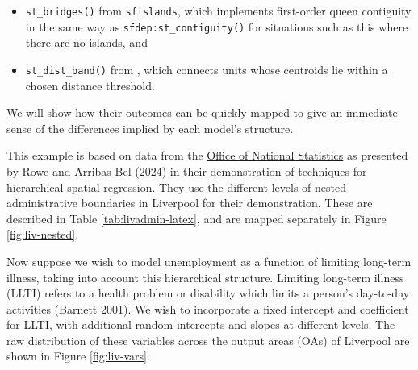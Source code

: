 \begin{itemize}
\tightlist
\item
  \texttt{st\_bridges()} from \texttt{sfislands}, which implements first-order queen contiguity in the same way as \texttt{sfdep:st\_contiguity()} for situations such as this where there are no islands, and
\item
  \texttt{st\_dist\_band()} from , which connects units whose centroids lie within a chosen distance threshold.
\end{itemize}

We will show how their outcomes can be quickly mapped to give an immediate sense of the differences implied by each model's structure.

This example is based on data from the \href{https://www.nomisweb.co.uk/home/census2001.asp}{Office of National Statistics} as presented by Rowe and Arribas-Bel (2024) in their demonstration of techniques for hierarchical spatial regression. They use the different levels of nested administrative boundaries in Liverpool for their demonstration. These are described in Table \ref{tab:livadmin-latex}, and are mapped separately in Figure \ref{fig:liv-nested}.

Now suppose we wish to model unemployment as a function of limiting long-term illness, taking into account this hierarchical structure. Limiting long-term illness (LLTI) refers to a health problem or disability which limits a person's day-to-day activities (Barnett 2001). We wish to incorporate a fixed intercept and coefficient for LLTI, with additional random intercepts and slopes at different levels. The raw distribution of these variables across the output areas (OAs) of Liverpool are shown in Figure
\ref{fig:liv-vars}.

